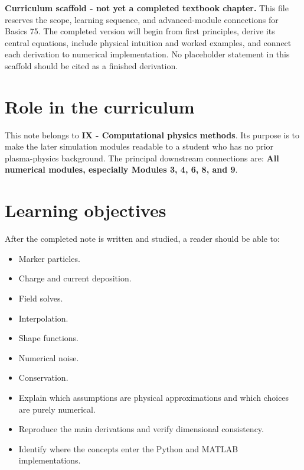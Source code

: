 \documentclass[11pt]{article}
\begin{document}

\begin{overviewbox}
\textbf{Curriculum scaffold - not yet a completed textbook chapter.} This file reserves the scope, learning sequence, and advanced-module connections for Basics 75. The completed version will begin from first principles, derive its central equations, include physical intuition and worked examples, and connect each derivation to numerical implementation. No placeholder statement in this scaffold should be cited as a finished derivation.
\end{overviewbox}

\ProjectTOC

\section{Role in the curriculum}
This note belongs to \textbf{IX - Computational physics methods}. Its purpose is to make the later simulation modules readable to a student who has no prior plasma-physics background. The principal downstream connections are: \textbf{All numerical modules, especially Modules 3, 4, 6, 8, and 9}.

\section{Learning objectives}
After the completed note is written and studied, a reader should be able to:
\begin{itemize}[leftmargin=1.6em]
\item Marker particles.
\item Charge and current deposition.
\item Field solves.
\item Interpolation.
\item Shape functions.
\item Numerical noise.
\item Conservation.
\item Explain which assumptions are physical approximations and which choices are purely numerical.
\item Reproduce the main derivations and verify dimensional consistency.
\item Identify where the concepts enter the Python and MATLAB implementations.
\end{itemize}
\end{document}
